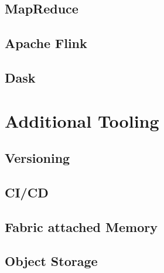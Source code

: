      \subsection*{MapReduce}
     \subsection*{Apache Flink}
     \subsection*{Dask}
     \newpage

\section{Additional Tooling}
    \blindtext[1]

    \subsection*{Versioning}
    \subsection*{CI/CD}
    \subsection*{Fabric attached Memory}
    \subsection*{Object Storage}
    \newpage
